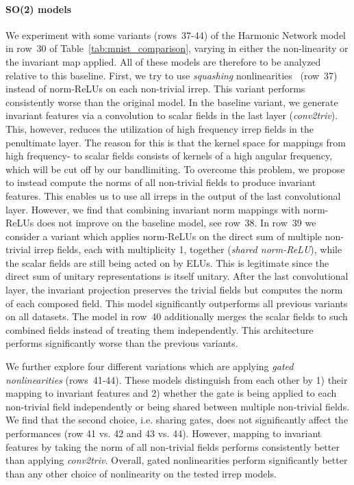 \documentclass{article}
\begin{document}
{{\paragraph{SO(2) models}
We experiment with some variants (rows~37-44) of the Harmonic Network model in row~30 of Table~\ref{tab:mnist_comparison}, varying in either the non-linearity or the invariant map applied.
All of these models are therefore to be analyzed relative to this baseline.
First, we try to use \emph{squashing} nonlinearities~\cite{Hinton2018-EMCAPS} (row~37) instead of norm-ReLUs on each non-trivial irrep.
This variant performs consistently worse than the original model.
In the baseline variant, we generate invariant features via a convolution to scalar fields in the last layer (\emph{conv2triv}).
This, however, reduces the utilization of high frequency irrep fields in the penultimate layer.
The reason for this is that the kernel space for mappings from high frequency- to scalar fields consists of kernels of a high angular frequency, which will be cut off by our bandlimiting.
To overcome this problem, we propose to instead compute the norms of all non-trivial fields to produce invariant features.
This enables us to use all irreps in the output of the last convolutional layer.
However, we find that combining invariant norm mappings with norm-ReLUs does not improve on the baseline model, see row~38.
In row~39 we consider a variant which applies norm-ReLUs on the direct sum of multiple non-trivial irrep fields, each with multiplicity 1, together (\textit{shared norm-ReLU}), while the scalar fields are still being acted on by ELUs.
This is legitimate since the direct sum of unitary representations is itself unitary.
After the last convolutional layer, the invariant projection preserves the trivial fields but computes the norm of each composed field.
This model significantly outperforms all previous variants on all datasets.
The model in row~40 additionally merges the scalar fields to such combined fields instead of treating them independently.
This architecture performs significantly worse than the previous variants.

We further explore four different variations which are applying \textit{gated nonlinearities} (rows~41-44).
These models distinguish from each other by 1) their mapping to invariant features and 2) whether the gate is being applied to each non-trivial field independently or being shared between multiple non-trivial fields.
We find that the second choice, i.e. sharing gates, does not significantly affect the performances (row 41 vs. 42 and 43 vs. 44).
However, mapping to invariant features by taking the norm of all non-trivial fields performs consistently better than applying \textit{conv2triv}.
Overall, gated nonlinearities perform significantly better than any other choice of nonlinearity on the tested  irrep models.



}}
\end{document}
